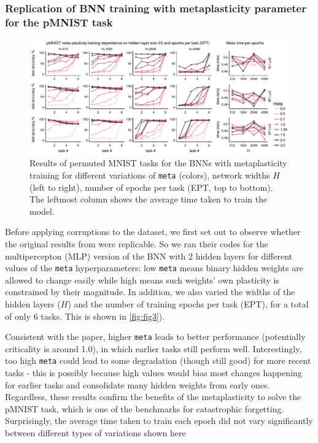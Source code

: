 \documentclass[manuscript,screen,review=false, nonacm]{acmart}
\begin{document}
\subsubsection{Replication of BNN training with metaplasticity parameter for the pMNIST task}

\begin{figure}[ht]
    \centering
    \includegraphics[width=1.1\textwidth]{figures/report/Fig3.pdf}
    \caption{
    Results of permuted MNIST tasks for the BNNs with metaplasticity training for different variations of \texttt{meta} (colors), network widths $H$ (left to right), number of epochs per task (EPT, top to bottom). The leftmost column shows the average time taken to train the model. 
    }
    \label{fig:fig3}
\end{figure}

Before applying corruptions to the dataset, we first set out to observe whether the original results from \cite{Laborieux_Ernoult_Hirtzlin_Querlioz_2021} were replicable. So we ran their codes for the multipercepton (MLP) version of the BNN with 2 hidden layers for different values of the \texttt{meta} hyperparameters: low \texttt{meta} means binary hidden weights are allowed to change easily while high means such weights’ own plasticity is constrained by their magnitude. In addition, we also varied the widths of the hidden layers ($H$) and the number of training epochs per task (EPT), for a total of only 6 tasks. This is shown in \autoref{fig:fig3}). 

Consistent with the paper, higher \texttt{meta} leads to better performance (potentially criticality is around 1.0), in which earlier tasks still perform well. Interestingly, too high \texttt{meta} could lead to some degradation (though still good) for more recent tasks - this is possibly because high values would bias most changes happening for earlier tasks and consolidate many hidden weights from early ones. Regardless, these results confirm the benefits of the metaplasticity to solve the pMNIST task, which is one of the benchmarks for catastrophic forgetting. Surprisingly, the average time taken to train each epoch did not vary significantly between different types of variations shown here  
\end{document}
